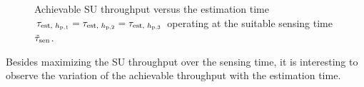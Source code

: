 \begin{figure}[!t]

\centering
{}
\caption{Achievable SU throughput versus the estimation time $\tau_{\text{est, $h_{\text{p,1}}$}} = \tau_{\text{est, $h_{\text{p,2}}$}} = \tau_{\text{est, $h_{\text{p,3}}$}}$ operating at the suitable sensing time $\tilde{\tau}_{\text{sen}}$.}
\label{fig:optT_est_time}
\vspace{-0.4cm}
\end{figure}
Besides maximizing the SU throughput over the sensing time, it is interesting to observe the variation of the achievable throughput with the estimation time. 

